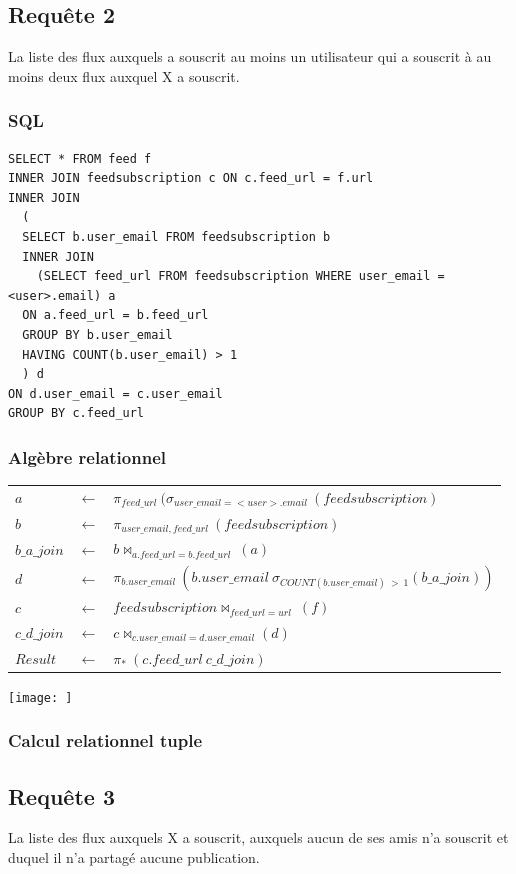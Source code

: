 \documentclass[a4paper,10pt]{article}
\begin{document}
\subsection{Requête 2}
La liste des flux auxquels a souscrit au moins un utilisateur qui a souscrit à au moins deux flux auxquel X
a souscrit.
\subsubsection{SQL}
\begin{lstlisting}
SELECT * FROM feed f
INNER JOIN feedsubscription c ON c.feed_url = f.url
INNER JOIN 
  (
  SELECT b.user_email FROM feedsubscription b 
  INNER JOIN 
    (SELECT feed_url FROM feedsubscription WHERE user_email = <user>.email) a
  ON a.feed_url = b.feed_url 
  GROUP BY b.user_email
  HAVING COUNT(b.user_email) > 1
  ) d
ON d.user_email = c.user_email
GROUP BY c.feed_url
\end{lstlisting}
\subsubsection{Algèbre relationnel}
\begin{center}
\begin{tabular}{lll}
$a$		& $\leftarrow$ & $ \pi_{feed\_url}\ (\sigma_{user\_email=<user>.email}\ (feedsubscription)$\\
$b$		& $\leftarrow$ & $ \pi_{user\_email, feed\_url}\ (feedsubscription)$\\
$b\_a\_join$	& $\leftarrow$ & $ b \Join_{a.feed\_url=b.feed\_url}\ (a)$\\
$d$		& $\leftarrow$ & $ \pi_{b.user\_email}\ (b.user\_email\ \sigma_{COUNT(b.user\_email)\ >\ 1} (b\_a\_join))$\\
$c$		& $\leftarrow$ & $ feedsubscription \Join_{feed\_url=url}\ (f)$\\
$c\_d\_join$	& $\leftarrow$ & $ c \Join_{c.user\_email=d.user\_email} (d)$\\
$Result$	& $\leftarrow$ & $ \pi_*\ (c.feed\_url\ c\_d\_join)$
\end{tabular}
\end{center}
\texttt{[image: ]}

\subsubsection{Calcul relationnel tuple}
\clearpage
\subsection{Requête 3}
La liste des flux auxquels X a souscrit, auxquels aucun de ses amis n’a souscrit et duquel il n’a partagé
aucune publication.
\end{document}
